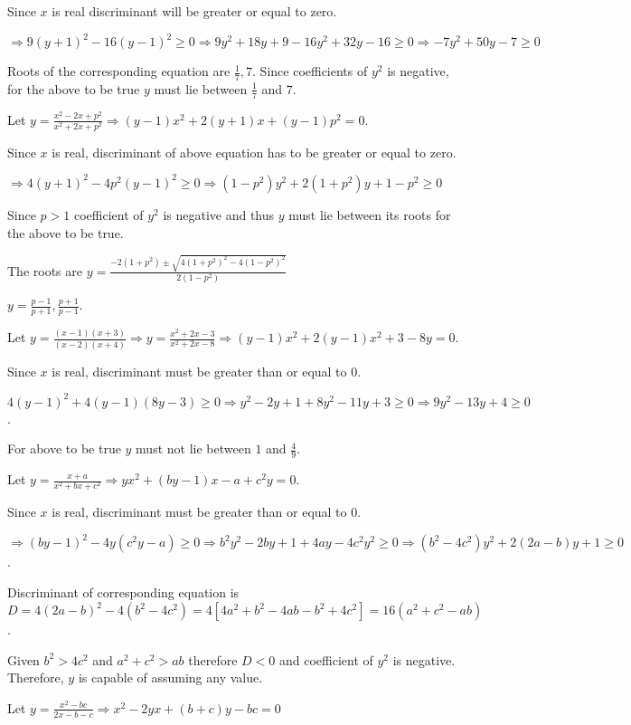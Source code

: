   Since $x$ is real discriminant will be greater or equal to zero.

  $\Rightarrow 9(y + 1)^2 - 16(y - 1)^2 \ge 0\Rightarrow 9y^2 + 18y + 9 - 16y^2 + 32y - 16 \ge
  0\Rightarrow -7y^2 + 50y - 7 \ge 0$

  Roots of the corresponding equation are $\frac{1}{7}, 7$. Since coefficients of $y^2$ is negative, for the above to
  be true $y$ must lie between $\frac{1}{7}$ and $7$.
\item Let $y = \frac{x^2 - 2x + p^2}{x^2 + 2x + p^2}\Rightarrow (y - 1)x^2 + 2(y + 1)x + (y - 1)p^2 = 0$.

  Since $x$ is real, discriminant of above equation has to be greater or equal to zero.

  $\Rightarrow 4(y + 1)^2 - 4p^2(y - 1)^2 \ge 0\Rightarrow (1 - p^2)y^2 + 2(1 + p^2)y + 1 - p^2 \ge 0$

  Since $p > 1$ coefficient of $y^2$ is negative and thus $y$ must lie between its roots for
  the above to be true.

  The roots are $y = \frac{-2(1 + p^2) \pm \sqrt{4(1 + p^2)^2 - 4(1 - p^2)^2}}{2(1 - p^2)}$

  $y = \frac{p - 1}{p + 1}, \frac{p + 1}{p - 1}$.
\item Let $y = \frac{(x - 1)(x + 3)}{(x - 2)(x + 4)}\Rightarrow y = \frac{x^2 + 2x - 3}{x^2 + 2x -
  8}\Rightarrow (y - 1)x^2 + 2(y - 1)x^2 + 3 - 8y = 0$.

  Since $x$ is real, discriminant must be greater than or equal to $0$.

  $4(y - 1)^2 + 4(y - 1)(8y - 3) \ge 0\Rightarrow y^2 - 2y + 1 + 8y^2 - 11y + 3 \ge 0\Rightarrow 9y^2 - 13y
  + 4 \ge 0$.

  For above to be true $y$ must not lie between $1$ and $\frac{4}{9}$.
\item Let $y = \frac{x + a}{x^2 + bx + c^2}\Rightarrow yx^2 + (by - 1)x - a + c^2y = 0$.

  Since $x$ is real, discriminant must be greater than or equal to $0$.

  $\Rightarrow (by - 1)^2 - 4y(c^2y - a) \ge 0\Rightarrow b^2y^2 - 2by + 1 + 4ay - 4c^2y^2 \ge 0\Rightarrow
  (b^2 - 4c^2)y^2 + 2(2a - b)y + 1 \ge 0$.

  Discriminant of corresponding equation is $D = 4(2a - b)^2 - 4(b^2 - 4c^2) = 4[4a^2 + b^2 - 4ab - b^2 +
    4c^2] = 16(a^2 + c^2 - ab)$.

  Given $b^2 > 4c^2$ and $a^2 + c^2 > ab$ therefore $D < 0$ and coefficient of $y^2$ is negative.
  Therefore, $y$ is capable of assuming any value.
\item Let $y = \frac{x^2 - bc}{2x - b - c}\Rightarrow x^2 - 2yx + (b + c)y - bc = 0$

